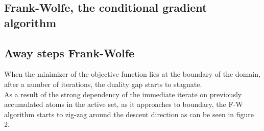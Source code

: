 \subsection{Frank-Wolfe, the conditional gradient algorithm}
\subsection{Away steps Frank-Wolfe}
When the minimizer of the objective function lies at the boundary of the domain,
after a number of iterations, the duality gap starts to stagnate.\\ As a result
of the strong dependency of the immediate iterate on previously accumulated
atoms in the active set, as it approaches to boundary, the F-W algorithm starts
to zig-zag around the descent direction as can be seen in figure 2.\\
\begin{algorithmic}
    \\
     \ENDFOR
\end{algorithmic}

